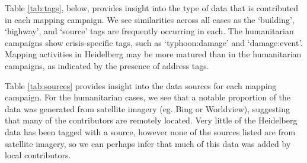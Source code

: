 Table \ref{tab:tags}, below, provides insight into the type of data that is contributed in each mapping campaign. We see similarities across all cases as the ‘building’, ‘highway’, and ‘source’ tags are frequently occurring in each. The humanitarian campaigns show crisis-specific tags, such as ‘typhoon:damage’ and ‘damage:event’. Mapping activities in Heidelberg may be more matured than in the humanitarian campaigns, as indicated by the presence of address tags. 

Table \ref{tab:sources} provides insight into the data sources for each mapping campaign. For the humanitarian cases, we see that a notable proportion of the data was generated from satellite imagery (eg. Bing or Worldview), suggesting that many of the contributors are remotely located. Very little of the Heidelberg data has been tagged with a source, however none of the sources listed are from satellite imagery, so we can perhaps infer that much of this data was added by local contributors. 

